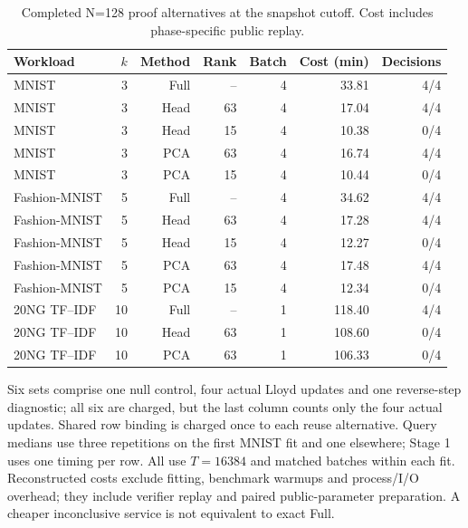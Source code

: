 \begin{table}[tp]
\centering
\small
\caption{Completed N=128 proof alternatives at the snapshot cutoff. Cost includes phase-specific public replay.}\label{tab:paired-costs}
\begin{tabular}{lrrrrrr}
\toprule
Workload & $k$ & Method & Rank & Batch & Cost (min) & Decisions \\
\midrule
MNIST & 3 & Full & -- & 4 & 33.81 & 4/4 \\
MNIST & 3 & Head & 63 & 4 & 17.04 & 4/4 \\
MNIST & 3 & Head & 15 & 4 & 10.38 & 0/4 \\
MNIST & 3 & PCA & 63 & 4 & 16.74 & 4/4 \\
MNIST & 3 & PCA & 15 & 4 & 10.44 & 0/4 \\
Fashion-MNIST & 5 & Full & -- & 4 & 34.62 & 4/4 \\
Fashion-MNIST & 5 & Head & 63 & 4 & 17.28 & 4/4 \\
Fashion-MNIST & 5 & Head & 15 & 4 & 12.27 & 0/4 \\
Fashion-MNIST & 5 & PCA & 63 & 4 & 17.48 & 4/4 \\
Fashion-MNIST & 5 & PCA & 15 & 4 & 12.34 & 0/4 \\
20NG TF--IDF & 10 & Full & -- & 1 & 118.40 & 4/4 \\
20NG TF--IDF & 10 & Head & 63 & 1 & 108.60 & 0/4 \\
20NG TF--IDF & 10 & PCA & 63 & 1 & 106.33 & 0/4 \\
\bottomrule
\end{tabular}
\par\smallskip\begin{minipage}{0.98\linewidth}\footnotesize Six sets comprise one null control, four actual Lloyd updates and one reverse-step diagnostic; all six are charged, but the last column counts only the four actual updates. Shared row binding is charged once to each reuse alternative. Query medians use three repetitions on the first MNIST fit and one elsewhere; Stage 1 uses one timing per row. All use $T=16384$ and matched batches within each fit. Reconstructed costs exclude fitting, benchmark warmups and process/I/O overhead; they include verifier replay and paired public-parameter preparation. A cheaper inconclusive service is not equivalent to exact Full.\end{minipage}
\end{table}

